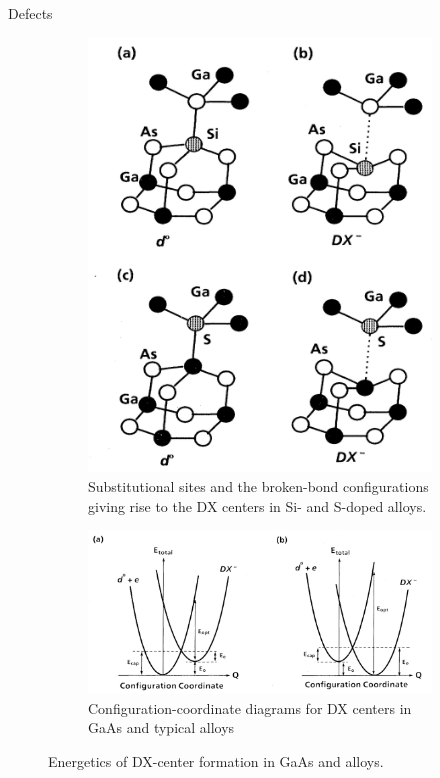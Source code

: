 \documentclass[aspectratio=169]{beamer}
\begin{document}
\begin{frame}{Defects}
\begin{figure}
    \centering
    \begin{subfigure}{0.3\textwidth}
        \centering
        \includegraphics[width=0.7\linewidth]{lectures/figures/8_DX_Centers.png}
    \caption{Substitutional sites and the broken-bond configurations giving rise to the DX centers in Si- and S-doped  alloys.}
    \end{subfigure}
    \begin{subfigure}{0.65\textwidth}
        \centering
        \includegraphics[width=\linewidth]{lectures/figures/8_Configuration_Diagram.png}
    \caption{Configuration-coordinate diagrams for DX centers in GaAs and typical  alloys}
    \end{subfigure}
    \caption{Energetics of DX-center formation in GaAs and  alloys.\cite{chadiEnergeticsDXcenterFormation1989}}
    \label{fig}
\end{figure} 
\end{frame} 
\end{document}
